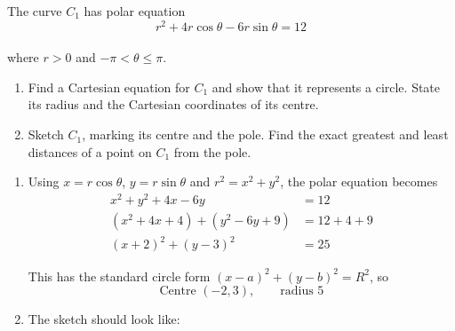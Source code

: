 \documentclass[leqno]{article}
\begin{document}
\begin{enumerate}[
  label=\textbf{\arabic*.},
  leftmargin=*,
  topsep=0pt,
  partopsep=0pt,
  parsep=0pt
]
\newpage

\questionitem

The curve $C_1$ has polar equation
\[
r^2+4r\cos\theta-6r\sin\theta=12
\] \\
where $r>0$ and $-\pi<\theta\leq\pi$. \\
\begin{enumerate}[label=\textbf{(\alph*)}]
\item Find a Cartesian equation for $C_1$ and show that it represents a circle. State its radius and the Cartesian coordinates of its centre.  \\
\item Sketch $C_1$, marking its centre and the pole. Find the exact greatest and least distances of a point on $C_1$ from the pole.  \\
\end{enumerate}

\vspace*{10pt}

\begin{djsSolution}
\begin{enumerate}[label=\textbf{(\alph*)}, start=1]
\item Using \(x=r\cos\theta\), \(y=r\sin\theta\) and \(r^2=x^2+y^2\), the polar equation becomes
\begin{align*}
x^2+y^2+4x-6y&=12\\
(x^2+4x+4)+(y^2-6y+9)&=12+4+9\\
(x+2)^2+(y-3)^2&=25
\end{align*}

This has the standard circle form \((x-a)^2+(y-b)^2=R^2\), so
\[
\text{Centre }(-2,3),\qquad \text{radius }5
\]

\item The sketch should look like:\par\nopagebreak



\end{enumerate}
\end{djsSolution}
\end{enumerate}
\end{document}

